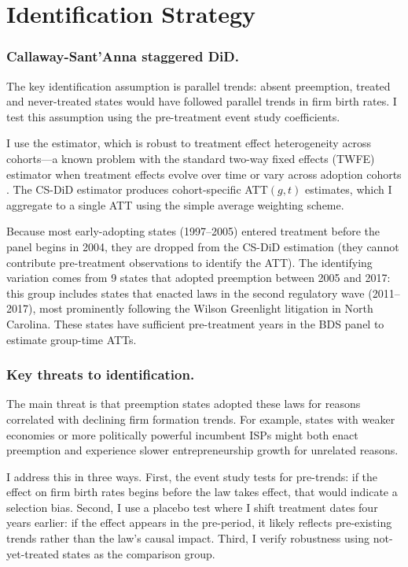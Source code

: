 \documentclass[12pt]{article}
\begin{document}
\section{Identification Strategy}\label{sec:design}

\subsubsection*{Callaway-Sant'Anna staggered DiD.} The key identification assumption is parallel trends: absent preemption, treated and never-treated states would have followed parallel trends in firm birth rates. I test this assumption using the pre-treatment event study coefficients.

I use the \citet{callaway2021difference} estimator, which is robust to treatment effect heterogeneity across cohorts---a known problem with the standard two-way fixed effects (TWFE) estimator when treatment effects evolve over time or vary across adoption cohorts \citep{goodman2021difference,sun2021estimating}. The CS-DiD estimator produces cohort-specific ATT$(g, t)$ estimates, which I aggregate to a single ATT using the simple average weighting scheme.

Because most early-adopting states (1997--2005) entered treatment before the panel begins in 2004, they are dropped from the CS-DiD estimation (they cannot contribute pre-treatment observations to identify the ATT). The identifying variation comes from 9 states that adopted preemption between 2005 and 2017: this group includes states that enacted laws in the second regulatory wave (2011--2017), most prominently following the Wilson Greenlight litigation in North Carolina. These states have sufficient pre-treatment years in the BDS panel to estimate group-time ATTs.

\subsubsection*{Key threats to identification.} The main threat is that preemption states adopted these laws for reasons correlated with declining firm formation trends. For example, states with weaker economies or more politically powerful incumbent ISPs might both enact preemption and experience slower entrepreneurship growth for unrelated reasons.

I address this in three ways. First, the event study tests for pre-trends: if the effect on firm birth rates begins before the law takes effect, that would indicate a selection bias. Second, I use a placebo test where I shift treatment dates four years earlier: if the effect appears in the pre-period, it likely reflects pre-existing trends rather than the law's causal impact. Third, I verify robustness using not-yet-treated states as the comparison group.
\end{document}
